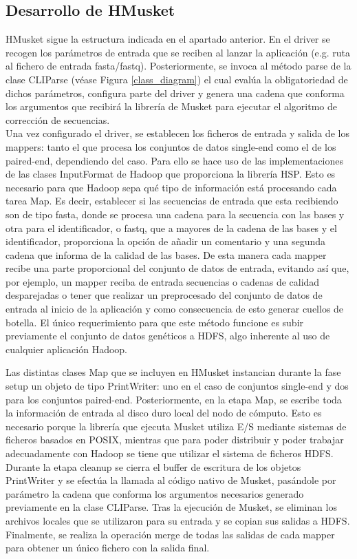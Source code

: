 \documentclass[conference]{IEEEtran}
\begin{document}
\subsection{Desarrollo de HMusket}
HMusket sigue la estructura indicada en el apartado anterior. En el driver se recogen los parámetros de entrada que se reciben al lanzar la aplicación (e.g. ruta al fichero de entrada fasta/fastq). Posteriormente, se invoca al método parse de la clase CLIParse (véase Figura \ref{class_diagram}) el cual evalúa la obligatoriedad de dichos parámetros, configura parte del driver y genera una cadena que conforma los argumentos que recibirá la librería de Musket para ejecutar el algoritmo de corrección de secuencias.\\
Una vez configurado el driver, se establecen los ficheros de entrada y salida de los mappers: tanto el que procesa los conjuntos de datos single-end como el de los paired-end, dependiendo del caso. Para ello se hace uso de las implementaciones de las clases InputFormat de Hadoop que proporciona la librería HSP. Esto es necesario para que Hadoop sepa qué tipo de información está procesando cada tarea Map. Es decir, establecer si las secuencias de entrada que esta recibiendo son de tipo fasta, donde se procesa una cadena para la secuencia con las bases y otra para el identificador, o fastq, que a mayores de la cadena de las bases y el identificador, proporciona la opción de añadir un comentario y una segunda cadena que informa de la calidad de las bases. De esta manera cada mapper recibe una parte proporcional del conjunto de datos de entrada, evitando así que, por ejemplo, un mapper reciba de entrada secuencias o cadenas de calidad desparejadas o tener que realizar un preprocesado del conjunto de datos de entrada al inicio de la aplicación y como consecuencia de esto generar cuellos de botella. El único requerimiento para que este método funcione es subir previamente el conjunto de datos genéticos a HDFS, algo inherente al uso de cualquier aplicación Hadoop.

Las distintas clases Map que se incluyen en HMusket instancian durante la fase setup un objeto de tipo PrintWriter: uno en el caso de conjuntos single-end y dos para los conjuntos paired-end. Posteriormente, en la etapa Map, se escribe toda la información de entrada al disco duro local del nodo de cómputo. Esto es necesario porque la librería que ejecuta Musket utiliza E/S mediante sistemas de ficheros basados en POSIX, mientras que para poder distribuir y poder trabajar adecuadamente con Hadoop se tiene que utilizar el sistema de ficheros HDFS.\\
Durante la etapa cleanup se cierra el buffer de escritura de los objetos PrintWriter y se efectúa la llamada al código nativo de Musket, pasándole por parámetro la cadena que conforma los argumentos necesarios generado previamente en la clase CLIParse. Tras la ejecución de Musket, se eliminan los archivos locales que se utilizaron para su entrada y se copian sus salidas a HDFS. Finalmente, se realiza la operación merge de todas las salidas de cada mapper para obtener un único fichero con la salida final.
\end{document}
